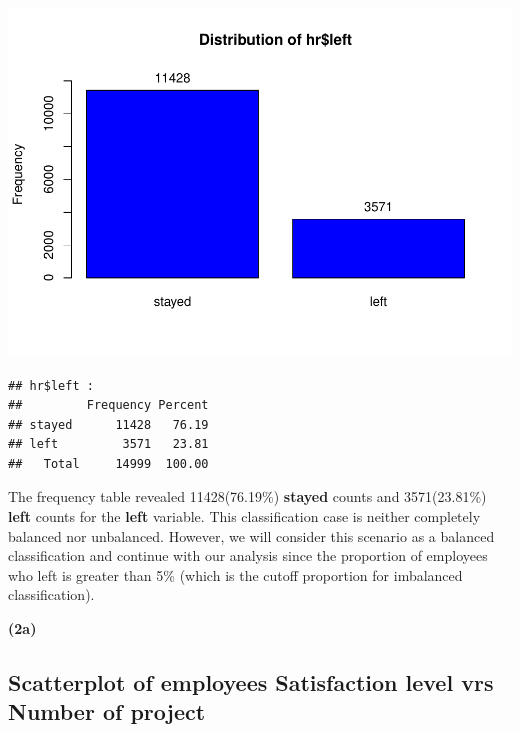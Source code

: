 \documentclass[
  11pt,
]{article}
\newenvironment{Shaded}{\begin{snugshade}}{\end{snugshade}}
\newcommand{\AttributeTok}[1]{\textcolor[rgb]{0.13,0.29,0.53}{#1}}
\newcommand{\CommentTok}[1]{\textcolor[rgb]{0.56,0.35,0.01}{\textit{#1}}}
\newcommand{\DecValTok}[1]{\textcolor[rgb]{0.00,0.00,0.81}{#1}}
\newcommand{\FunctionTok}[1]{\textcolor[rgb]{0.13,0.29,0.53}{\textbf{#1}}}
\newcommand{\NormalTok}[1]{#1}
\newcommand{\SpecialCharTok}[1]{\textcolor[rgb]{0.81,0.36,0.00}{\textbf{#1}}}
\newcommand{\StringTok}[1]{\textcolor[rgb]{0.31,0.60,0.02}{#1}}
\begin{document}
\begin{Shaded}
\end{Shaded}

\includegraphics[width=0.9\linewidth]{OWUSU_project_files/figure-latex/unnamed-chunk-7-1}

\begin{verbatim}
## hr$left : 
##         Frequency Percent
## stayed      11428   76.19
## left         3571   23.81
##   Total     14999  100.00
\end{verbatim}


The frequency table revealed 11428(76.19\%) \textbf{stayed} counts and
3571(23.81\%) \textbf{left} counts for the \textbf{left} variable. This
classification case is neither completely balanced nor unbalanced.
However, we will consider this scenario as a balanced classification and
continue with our analysis since the proportion of employees who left is
greater than 5\% (which is the cutoff proportion for imbalanced
classification).

\hfill\break
\textbf{(2a)}

\subsection{Scatterplot of employees Satisfaction level vrs Number of project}
\end{document}
